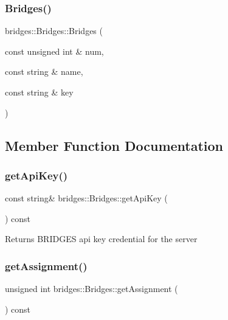 \subsubsection{\texorpdfstring{Bridges()}{Bridges()}\hspace{0.1cm}{\footnotesize\ttfamily [3/3]}}
{\footnotesize\ttfamily bridges\+::\+Bridges\+::\+Bridges (\begin{DoxyParamCaption}\item[{const unsigned int \&}]{num,  }\item[{const string \&}]{name,  }\item[{const string \&}]{key }\end{DoxyParamCaption})\hspace{0.3cm}{\ttfamily [inline]}}



\subsection{Member Function Documentation}
\mbox{\label{classbridges_1_1_bridges_a9a44f38d883859ef19c94ce17eec43b5}} 
\subsubsection{\texorpdfstring{get\+Api\+Key()}{getApiKey()}}
{\footnotesize\ttfamily const string\& bridges\+::\+Bridges\+::get\+Api\+Key (\begin{DoxyParamCaption}{ }\end{DoxyParamCaption}) const\hspace{0.3cm}{\ttfamily [inline]}}

\begin{DoxyReturn}{Returns}
B\+R\+I\+D\+G\+ES api key credential for the server 
\end{DoxyReturn}
\mbox{\label{classbridges_1_1_bridges_aa45b4ba781b5cbecc8cb04c76dfd527a}} 
\subsubsection{\texorpdfstring{get\+Assignment()}{getAssignment()}}
{\footnotesize\ttfamily unsigned int bridges\+::\+Bridges\+::get\+Assignment (\begin{DoxyParamCaption}{ }\end{DoxyParamCaption}) const\hspace{0.3cm}{\ttfamily [inline]}}

